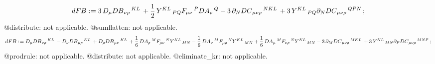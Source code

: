 \documentclass[11pt]{article}
\def\specialcolon{\mathrel{\mathop{:}}\hspace{-.5em}}
\begin{document}
\begin{dmath*}[compact, spread=2pt]
dFB\specialcolon{}= 3\, {D}_{\mu}{{DB}_{\nu \rho}\,^{K L}}\,  + \frac{1}{2}\, {Y}^{K L}\,_{P Q} {F}_{\mu \nu}\,^{P} {DA}_{\rho}\,^{Q} - 3\, {\partial}_{N}{{DC}_{\mu \nu \rho}\,^{N K L}}\,  + 3\, {Y}^{K L}\,_{P Q} {\partial}_{N}{{DC}_{\mu \nu \rho}\,^{Q P N}}\, ;
\end{dmath*}
@distribute: not applicable.
@sumflatten: not applicable.
\begin{dmath*}[compact, spread=2pt]
dFB\specialcolon{}= {D}_{\mu}{{DB}_{\nu \rho}\,^{K L}}\,  - {D}_{\nu}{{DB}_{\mu \rho}\,^{K L}}\,  + {D}_{\rho}{{DB}_{\mu \nu}\,^{K L}}\,  + \frac{1}{6}\, {DA}_{\rho}\,^{M} {F}_{\mu \nu}\,^{N} {Y}^{K L}\,_{M N} - \frac{1}{6}\, {DA}_{\nu}\,^{M} {F}_{\mu \rho}\,^{N} {Y}^{K L}\,_{M N} + \frac{1}{6}\, {DA}_{\mu}\,^{M} {F}_{\nu \rho}\,^{N} {Y}^{K L}\,_{M N} - 3\, {\partial}_{M}{{DC}_{\mu \nu \rho}\,^{M K L}}\,  + 3\, {Y}^{K L}\,_{M N} {\partial}_{P}{{DC}_{\mu \nu \rho}\,^{M N P}}\, ;
\end{dmath*}
@prodrule: not applicable.
@distribute: not applicable.
@eliminate\_kr: not applicable.
\end{document}
